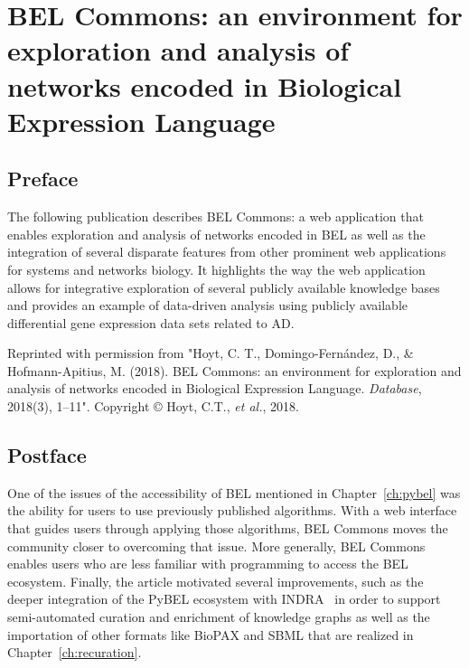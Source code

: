 \chapter{BEL Commons: an environment for exploration and analysis of networks encoded in Biological Expression Language}\label{ch:belcommons}

\section*{Preface}

The following publication describes BEL Commons: a web application that enables exploration and analysis of networks encoded in \ac{BEL} as well as the integration of several disparate features from other prominent web applications for systems and networks biology.
It highlights the way the web application allows for integrative exploration of several publicly available knowledge bases and provides an example of data-driven analysis using publicly available differential gene expression data sets related to \ac{AD}.

\vspace*{\fill}

Reprinted with permission from "Hoyt, C. T., Domingo-Fern\'{a}ndez, D., \& Hofmann-Apitius, M. (2018). BEL Commons: an environment for exploration and analysis of networks encoded in Biological Expression Language. \textit{Database}, 2018(3), 1–11".
Copyright © Hoyt, C.T., \textit{et al.}, 2018.



\section*{Postface}

One of the issues of the accessibility of \ac{BEL} mentioned in Chapter~\ref{ch:pybel} was the ability for users to use previously published algorithms.
With a web interface that guides users through applying those algorithms, BEL Commons moves the community closer to overcoming that issue.
More generally, BEL Commons enables users who are less familiar with programming to access the \ac{BEL} ecosystem.
Finally, the article motivated several improvements, such as the deeper integration of the PyBEL ecosystem with \ac{INDRA}~\cite{Gyori2017} in order to support semi-automated curation and enrichment of knowledge graphs as well as the importation of other formats like \ac{BioPAX} and \ac{SBML} that are realized in Chapter~\ref{ch:recuration}.
